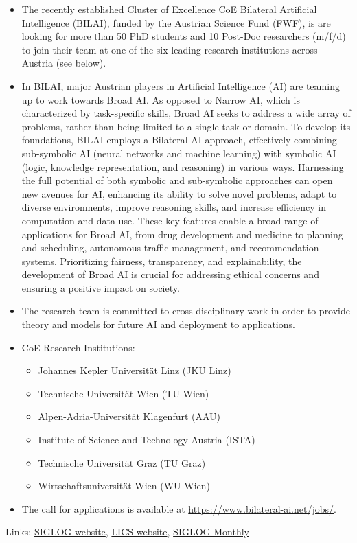 \documentclass[prodmode,acmtecs]{acmsmall} %
\begin{document}
\begin{itemize}\item  The recently established Cluster of Excellence CoE Bilateral Artificial Intelligence (BILAI), funded by the Austrian Science Fund (FWF), is are looking for more than 50 PhD students and 10 Post-Doc researchers (m/f/d) to join their team at one of the six leading research institutions across Austria (see below). 
 
\item  In BILAI, major Austrian players in Artificial Intelligence (AI) are teaming up to work towards Broad AI. As opposed to Narrow AI, which is characterized by task-specific skills, Broad AI seeks to address a wide array of problems, rather than being limited to a single task or domain. To develop its foundations, BILAI employs a Bilateral AI approach, effectively combining sub-symbolic AI (neural networks and machine learning) with symbolic AI (logic, knowledge representation, and reasoning) in various ways. Harnessing the full potential of both symbolic and sub-symbolic approaches can open new avenues for AI, enhancing its ability to solve novel problems, adapt to diverse environments, improve reasoning skills, and increase efficiency in computation and data use. These key features enable a broad range of applications for Broad AI, from drug development and medicine to planning and scheduling, autonomous traffic management, and recommendation systems. Prioritizing fairness, transparency, and explainability, the development of Broad AI is crucial for addressing ethical concerns and ensuring a positive impact on society. 
 
\item  The research team is committed to cross-disciplinary work in order to provide theory and models for future AI and deployment to applications. 
 
\item  CoE Research Institutions: 
 
\begin{itemize}\item  Johannes Kepler Universität Linz (JKU Linz)
\item  Technische Universität Wien (TU Wien)
\item  Alpen-Adria-Universität Klagenfurt (AAU)
\item  Institute of Science and Technology Austria (ISTA)
\item  Technische Universität Graz (TU Graz)
\item  Wirtschaftsuniversität Wien (WU Wien)
\end{itemize} 
\item  The call for applications is available at \href{https://www.bilateral-ai.net/jobs/}{https://www.bilateral-ai.net/jobs/}. 
 
\end{itemize}


\bigskip Links: \href{http://siglog.org/}{SIGLOG website}, \href{https://lics.siglog.org}{LICS website}, \href{https://lics.siglog.org/newsletters/}{SIGLOG Monthly}
\end{document}
